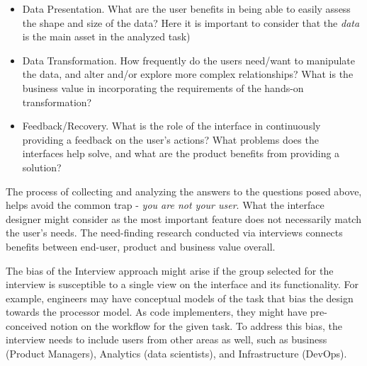 \documentclass[12pt,letterpaper]{article}
\begin{document}
\begin{itemize}
    \item Data Presentation. What are the user benefits in being able to easily assess the shape and size of the data? Here it is important to consider that the \textit{data} is the main asset in the analyzed task)  
    \item Data Transformation. How frequently do the users need/want to manipulate the data, and alter and/or explore more complex relationships? What is the business value in incorporating the requirements of the hands-on transformation?
    \item Feedback/Recovery. What is the role of the interface in continuously providing a feedback on the user's actions? What problems does the interfaces help solve, and what are the product benefits from providing a solution?
\end{itemize}

The process of collecting and analyzing the answers to the questions posed above, helps avoid the common trap - \textit{you are not your user}. What the interface designer might consider as the most important feature does not necessarily match the user's needs. The need-finding research conducted via interviews connects benefits between end-user, product and business value overall. 

The bias of the Interview approach might arise if the group selected for the interview is susceptible to a single view on the interface and its functionality. For example, engineers may have conceptual models of the task that bias the design towards the processor model. As code implementers, they might have pre-conceived notion on the workflow for the given task. To address this bias, the interview needs to include users from other areas as well, such as business (Product Managers), Analytics (data scientists), and Infrastructure (DevOps). 

 

\end{document}
